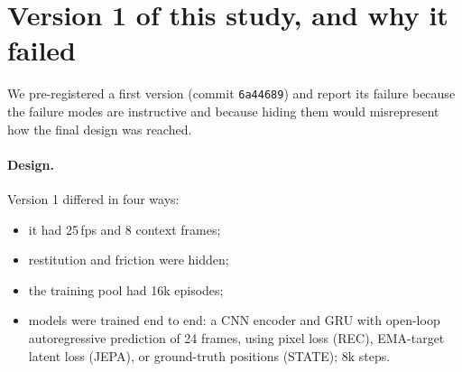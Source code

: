 \section{Version 1 of this study, and why it failed}
\label{app:v1}

We pre-registered a first version (commit \texttt{6a44689}) and report its failure because the
failure modes are instructive and because hiding them would misrepresent how the final design was
reached.

\paragraph{Design.} Version 1 differed in four ways:
\begin{itemize}
\item it had 25\,fps and 8 context frames;
\item restitution and friction were hidden;
\item the training pool had 16k episodes;
\item models were trained end to end: a CNN encoder and GRU with open-loop autoregressive
prediction of 24 frames, using pixel loss (REC), EMA-target latent loss (JEPA), or ground-truth
positions (STATE); 8k steps.
\end{itemize}


